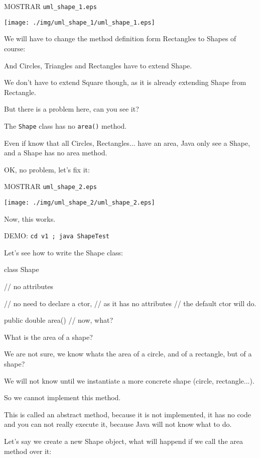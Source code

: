 \documentclass[a4paper, 9pt]{extarticle}
\begin{document}
MOSTRAR \verb+uml_shape_1.eps+
\begin{center}
  \texttt{[image: ./img/uml\_shape\_1/uml\_shape\_1.eps]}
\end{center}

We will have to change the method definition form Rectangles to Shapes of
course:


And Circles, Triangles and Rectangles have to extend Shape.

We don't have to extend Square though, as it is already extending Shape from Rectangle.

But there is a problem here, can you see it?

The \texttt{Shape} class has no \texttt{area()} method.

Even if know that all Circles, Rectangles... have an area, Java only see a
Shape, and a Shape has no area method.

OK, no problem, let's fix it:

MOSTRAR \verb+uml_shape_2.eps+
\begin{center}
  \texttt{[image: ./img/uml\_shape\_2/uml\_shape\_2.eps]}
\end{center}

Now, this works.

DEMO: \verb+cd v1 ; java ShapeTest+

Let's see how to write the Shape class:

\begin{blackboard}
class Shape {
  // no attributes

  // no need to declare a ctor,
  // as it has no attributes
  // the default ctor will do.

  public double area() {
    // now, what?
  }
}
\end{blackboard}

What is the area of a shape?

We are not sure, we know whats the area of a circle, and of a rectangle, but of a shape?

We will not know until we instantiate a more concrete shape (circle, rectangle...).

So we cannot implement this method.

This is called an abstract method, because it is not implemented, it has no
code and you can not really execute it, because Java will not know what to do.


Let's say we create a new Shape object, what will happend if we call the area method over it:
\end{document}
